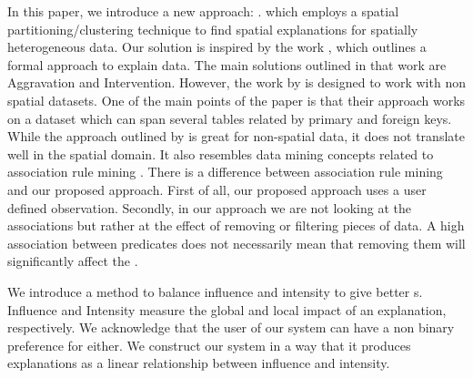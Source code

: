 
In this paper, we introduce a new approach: {\solution}. which employs a spatial partitioning/clustering technique to find spatial explanations for spatially heterogeneous data. Our solution is inspired by the work \cite{roy2014formal}, which outlines a formal approach to explain data. The main solutions outlined in that work are Aggravation and Intervention. However, the work by \cite{roy2014formal} is designed to work with non spatial datasets. One of the main points of the paper is that their approach works on a dataset which can span several tables related by primary and foreign keys. While the approach outlined by \cite{roy2014formal} is great for non-spatial data, it does not translate well in the spatial domain. 
It also resembles data mining concepts related to association rule mining \cite{agarwal1994fast,tan2006introduction}. 
There is a difference between association rule mining and our proposed approach. First of all, our proposed approach uses a user defined observation. Secondly, in our approach we are not looking at the associations but rather at the effect of removing or filtering pieces of data. A high association between predicates does not necessarily mean that removing them will significantly affect the {\fact}.


We introduce a method to balance influence and intensity to give better {\explanation}s. Influence and Intensity measure the global and local impact of an explanation, respectively. We acknowledge that the user of our system can have a non binary preference for either. We construct our system in a way that it produces explanations as a linear relationship between influence and intensity.


